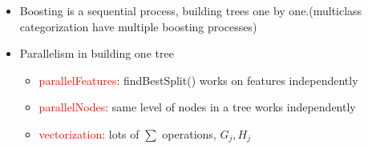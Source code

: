 \documentclass{beamer}
\begin{document}
\begin{frame}
\begin{columns}[c]
		\begin{itemize}
			\item Boosting is a sequential process, building trees one by one.(multiclass categorization have multiple boosting processes)
			\item Parallelism in building one tree
			\begin{itemize}			
				\item \textcolor{red}{parallelFeatures}: findBestSplit() works on features independently
				\item \textcolor{red}{parallelNodes}: same level of nodes in a tree works independently
				\item \textcolor{red}{vectorization}: lots of $\sum$ operations, $G_j, H_j$
			\end{itemize}			
		\end{itemize}
	\end{columns}	
\end{frame}
\end{document}

